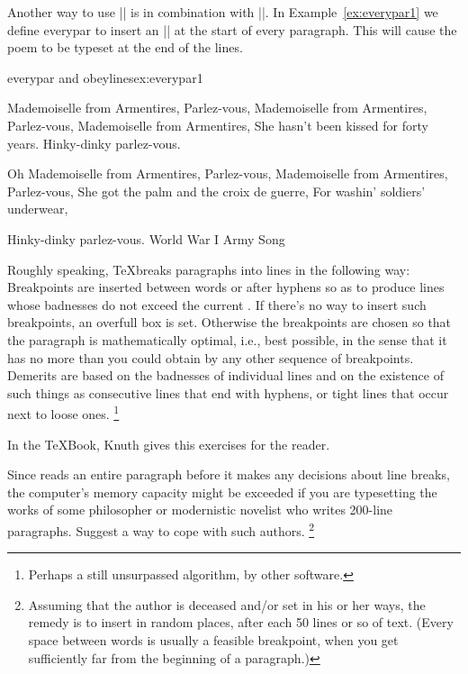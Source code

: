 \bigskip
Another way to use |\obeylines| is in combination with |\everypar|. In Example~\ref{ex:everypar1}
we define everypar to insert an |\hfill| at the start of every paragraph. This will cause the
poem to be typeset at the end of the lines.

\begin{texexample}{everypar and obeylines}{ex:everypar1}
{\obeylines\everypar{\hfill}\parindent=0pt
Mademoiselle from Armentires, Parlez-vous,
Mademoiselle from Armentires, Parlez-vous,
Mademoiselle from Armentires,
She hasn't been kissed for forty years.
Hinky-dinky parlez-vous.

Oh Mademoiselle from Armentires, Parlez-vous,
Mademoiselle from Armentires, Parlez-vous,
She got the palm and the croix de guerre,
For washin' soldiers' underwear,

Hinky-dinky parlez-vous.
\hfil World War I Army Song\par}
\end{texexample}

Roughly speaking, \TeX breaks paragraphs into lines in the following
way: Breakpoints are inserted between words or after hyphens so as to produce
lines whose badnesses do not exceed the current . If there's no way
to insert such breakpoints, an overfull box is set. Otherwise the breakpoints are
chosen so that the paragraph is mathematically optimal, i.e., best possible, in
the sense that it has no more  than you could obtain by any other
sequence of breakpoints. Demerits are based on the badnesses of individual lines
and on the existence of such things as consecutive lines that end with hyphens,
or tight lines that occur next to loose ones.  \footnote{Perhaps a still unsurpassed algorithm, by other software.}

In the TeXBook, Knuth gives this exercises for the reader. 

\begin{latexquotation}
Since \tex reads an entire paragraph before it makes any decisions about
line breaks, the computer's memory capacity might be exceeded if you are typesetting
the works of some philosopher or modernistic novelist who writes 200-line paragraphs.
Suggest a way to cope with such authors. \footnote{Assuming that the author is deceased and/or set in his or her ways, the remedy
is to insert {   } in random places, after
each 50 lines or so of text. (Every space between words is usually a feasible breakpoint,
when you get sufficiently far from the beginning of a paragraph.)}
\end{latexquotation}

